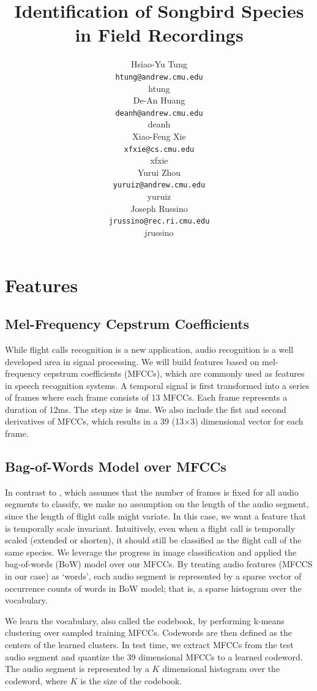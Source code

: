 \documentclass{article} %
\title{Identification of Songbird Species in Field Recordings
}
\author{
Hsiao-Yu Tung \\
\texttt{htung@andrew.cmu.edu} \\
htung \\
\And
De-An Huang \\
\texttt{deanh@andrew.cmu.edu} \\
deanh \\
\And
Xiao-Feng Xie \\
\texttt{xfxie@cs.cmu.edu} \\
xfxie \\
\And
Yurui Zhou\\
\texttt{yuruiz@andrew.cmu.edu}\\
yuruiz \\
\And
Joseph Russino\\
\texttt{jrussino@rec.ri.cmu.edu}\\
jrussino \\
}
\begin{document}
\maketitle


\section{Features}
\subsection{Mel-Frequency Cepstrum Coefficients }
While flight calls recognition is a new application, audio recognition is a well developed area in signal processing. We will build features based on  mel-frequency cepstrum coefficients (MFCCs), which are commonly used as features in speech recognition systems. A temporal signal is first transformed into a series of frames where each frame consists of 13 MFCCs. Each frame represents a duration of 12ms. The step size is 4ms. We also include the fist and second derivatives of MFCCs, which results in a 39 (13$\times$3) dimensional vector for each frame.

\subsection{Bag-of-Words Model over MFCCs}
\label{sec:bow}

In contrast to \cite{Dufour_NIPSW13}, which assumes that the number of frames is fixed for all audio segments to classify, we make no assumption on the length of the audio segment, since the length of flight calls might variate. In this case, we want a feature that is temporally scale invariant. Intuitively, even when a flight call is temporally scaled (extended or shorten), it should still be classified as the flight call of the same species. We leverage the progress in image classification and applied the bag-of-words (BoW) model \cite{Li_CVPR05} over our MFCCs. By treating audio features (MFCCS in our case) as `words', each audio segment is represented by a sparse vector of occurrence counts of words in BoW model; that is, a sparse histogram over the vocabulary.

We learn the vocabulary, also called the codebook, by performing k-means clustering over sampled training MFCCs. Codewords are then defined as the centers of the learned clusters. In test time, we extract MFCCs from the test audio segment and quantize the 39 dimensional MFCCs to a learned codeword. The audio segment is represented by a $K$ dimensional histogram over the codeword, where $K$ is the size of the codebook. 
\end{document}

